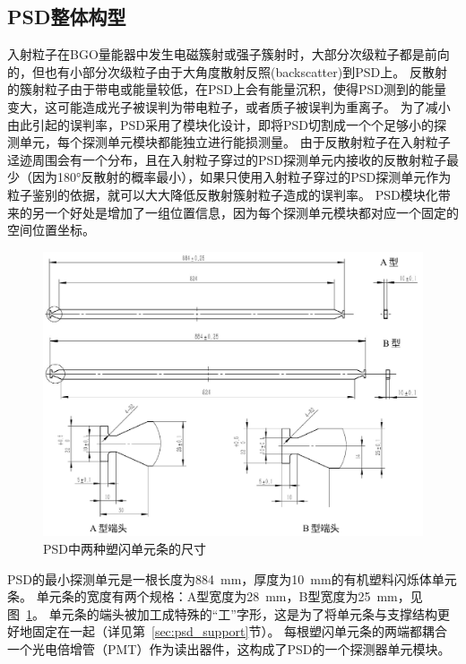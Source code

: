 \subsection{PSD整体构型}
\label{sec:psd_composition}
入射粒子在BGO量能器中发生电磁簇射或强子簇射时，大部分次级粒子都是前向的，但也有小部分次级粒子由于大角度散射反照(backscatter)到PSD上。
反散射的簇射粒子由于带电或能量较低，在PSD上会有能量沉积，使得PSD测到的能量变大，这可能造成光子被误判为带电粒子，或者质子被误判为重离子。
为了减小由此引起的误判率，PSD采用了模块化设计，即将PSD切割成一个个足够小的探测单元，每个探测单元模块都能独立进行能损测量。
由于反散射粒子在入射粒子迳迹周围会有一个分布，且在入射粒子穿过的PSD探测单元内接收的反散射粒子最少（因为\ang{180}反散射的概率最小），如果只使用入射粒子穿过的PSD探测单元作为粒子鉴别的依据，就可以大大降低反散射簇射粒子造成的误判率。
PSD模块化带来的另一个好处是增加了一组位置信息，因为每个探测单元模块都对应一个固定的空间位置坐标。

\begin{figure}
	\centering
	\includegraphics[width=\linewidth]{chap/description/fig/bars}
	\caption{PSD中两种塑闪单元条的尺寸}
	\label{fig:ch2:bars}
\end{figure}

PSD的最小探测单元是一根长度为\SI{884}{\milli\meter}，厚度为\SI{10}{\milli\meter}的有机塑料闪烁体单元条。
单元条的宽度有两个规格：A型宽度为\SI{28}{\milli\meter}，B型宽度为\SI{25}{\milli\meter}，见图~\ref{fig:ch2:bars}。
单元条的端头被加工成特殊的“工”字形，这是为了将单元条与支撑结构更好地固定在一起（详见第~\ref{sec:psd_support}节）。
每根塑闪单元条的两端都耦合一个光电倍增管（PMT）作为读出器件，这构成了PSD的一个探测器单元模块。

